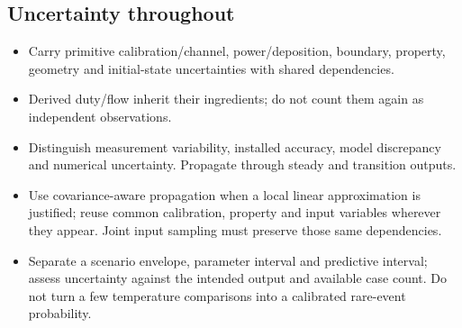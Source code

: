 \subsection{Uncertainty throughout}\label{subsec:uncertainty-throughout}

\begin{itemize}[leftmargin=*]
\item Carry primitive calibration/\allowbreak{}channel, power/\allowbreak{}deposition, boundary, property, geometry and initial-state uncertainties with shared dependencies.
\item Derived duty/\allowbreak{}flow inherit their ingredients; do not count them again as independent observations.
\item Distinguish measurement variability, installed accuracy, model discrepancy and numerical uncertainty. Propagate through steady and transition outputs.
\item Use covariance-aware propagation when a local linear approximation is justified; reuse common calibration, property and input variables wherever they appear. Joint input sampling must preserve those same dependencies.\cite{jcgm2011vectorcovariance,jcgm2020measurementmodels}
\item Separate a scenario envelope, parameter interval and predictive interval; assess uncertainty against the intended output and available case count. Do not turn a few temperature comparisons into a calibrated rare-event probability.


\end{itemize}
